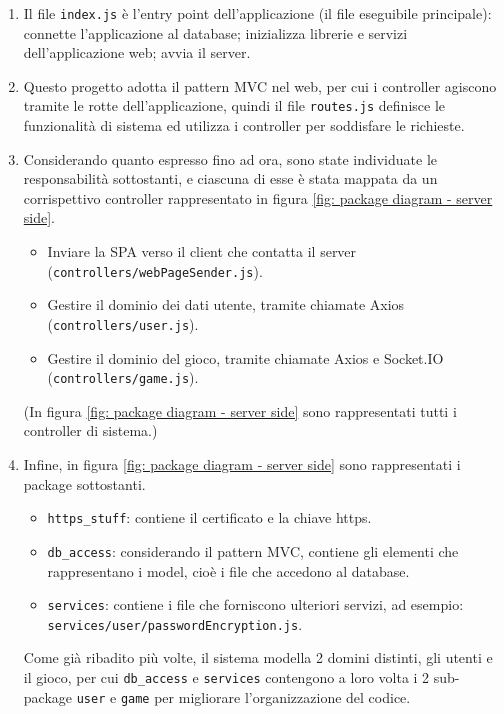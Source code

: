 \begin{enumerate}
\item
	Il file \texttt{index.js} è l'entry point dell'applicazione (il file eseguibile principale): connette l'applicazione al database; inizializza librerie e servizi dell'applicazione web; avvia il server.
\item
	Questo progetto adotta il pattern MVC nel web, per cui i controller agiscono tramite le rotte dell'applicazione, quindi il file \texttt{routes.js} definisce le funzionalità di sistema ed utilizza i controller per soddisfare le richieste.
\item
	Considerando quanto espresso fino ad ora, sono state individuate le responsabilità sottostanti, e ciascuna di esse è stata mappata da un corrispettivo controller rappresentato in figura \ref{fig: package diagram - server side}.
	\begin{itemize}
		\item
		Inviare la SPA verso il client che contatta il server
		\newline
		(\texttt{controllers/webPageSender.js}).
		\item
		Gestire il dominio dei dati utente, tramite chiamate Axios
		\newline
		(\texttt{controllers/user.js}).
		\item
		Gestire il dominio del gioco, tramite chiamate Axios e Socket.IO
		\newline
		(\texttt{controllers/game.js}).
	\end{itemize}
	(In figura \ref{fig: package diagram - server side} sono rappresentati tutti i controller di sistema.)
\item
	Infine, in figura \ref{fig: package diagram - server side} sono rappresentati i package sottostanti.
	\begin{itemize}
	\item
		\texttt{https\_stuff}: contiene il certificato e la chiave https.
	\item
		\texttt{db\_access}: considerando il pattern MVC, contiene gli elementi che rappresentano i model, cioè i file che accedono al database.
	\item
		\texttt{services}: contiene i file che forniscono ulteriori servizi, ad esempio: \texttt{services/user/passwordEncryption.js}.
	\end{itemize}
	Come già ribadito più volte, il sistema modella 2 domini distinti, gli utenti e il gioco, per cui \texttt{db\_access} e \texttt{services} contengono a loro volta i 2 sub-package \texttt{user} e \texttt{game} per migliorare l'organizzazione del codice.
\end{enumerate}

